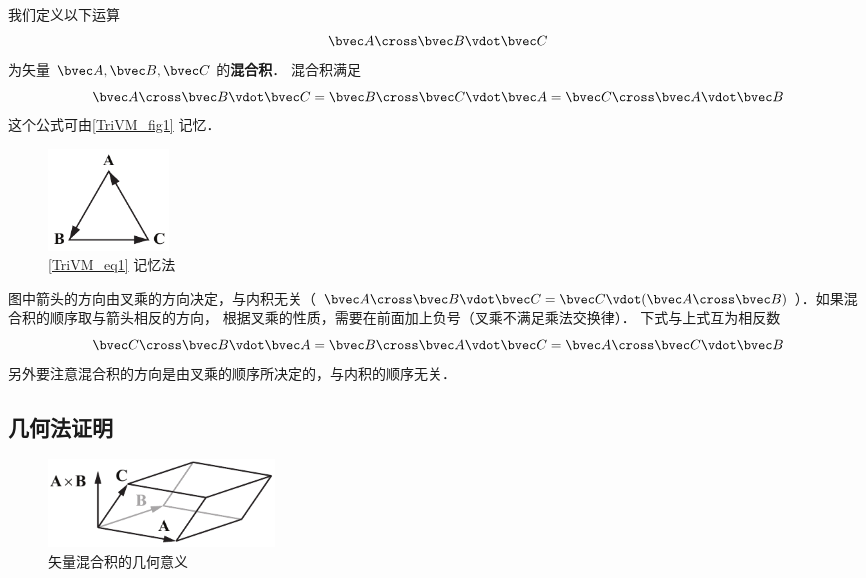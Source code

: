 
我们定义以下运算
\begin{equation}
\bvec A \cross \bvec B \vdot \bvec C
\end{equation}
为矢量 $\bvec A, \bvec B, \bvec C$ 的\textbf{混合积}． 混合积满足
\begin{equation}\label{TriVM_eq1}
\bvec A \cross \bvec B \vdot \bvec C = \bvec B \cross \bvec C \vdot \bvec A = \bvec C \cross \bvec A \vdot \bvec B 
\end{equation} 
这个公式可由\autoref{TriVM_fig1} 记忆．
\begin{figure}[ht]
\centering
\includegraphics[width=3.2cm]{./figures/TriVM1.pdf}
\caption{\autoref{TriVM_eq1} 记忆法}\label{TriVM_fig1}
\end{figure}
图中箭头的方向由叉乘的方向决定，与内积无关（$\bvec A\cross \bvec B \vdot \bvec C = \bvec C \vdot (\bvec A \cross \bvec B)$）．如果混合积的顺序取与箭头相反的方向， 根据叉乘的性质，需要在前面加上负号（叉乘不满足乘法交换律）． 下式与上式互为相反数
\begin{equation}
\bvec C \cross \bvec B \vdot \bvec A = \bvec B \cross \bvec A \vdot \bvec C = \bvec A \cross \bvec C \vdot \bvec B
\end{equation} 
另外要注意混合积的方向是由叉乘的顺序所决定的，与内积的顺序无关．

\subsection{几何法证明}

\begin{figure}[ht]
\centering
\includegraphics[width=6cm]{./figures/TriVM2.pdf}
\caption{矢量混合积的几何意义} \label{TriVM_fig2}
\end{figure}


